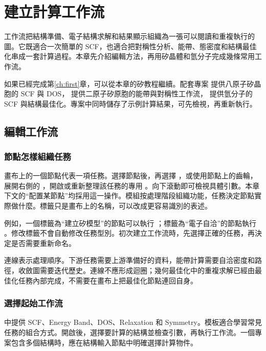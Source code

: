 \chapter{建立計算工作流}\label{ch:workflows}

工作流把結構準備、電子結構求解和結果顯示組織為一張可以閱讀和重複執行的圖。它既適合一次簡單的 SCF，也適合把對稱性分析、能帶、態密度和結構最佳化串成一套計算過程。本章先介紹編輯方法，再用矽晶體和氫分子完成幾條常用工作流。

如果已經完成第\ref{ch:first}章，可以從本章的矽教程繼續。配套專案  提供八原子矽晶胞的 SCF 與 DOS， 提供二原子矽原胞的能帶與對稱性工作流， 提供氫分子的 SCF 與結構最佳化。專案中同時儲存了示例計算結果，可先檢視，再重新執行。

\section{編輯工作流}

\subsection{節點怎樣組織任務}

畫布上的一個節點代表一項任務。選擇節點後，再選擇 ，或使用節點上的齒輪，展開右側的 ，開啟或重新整理該任務的專用 。向下滾動即可檢視具體引數。本章下文的“配置某節點”均採用這一操作。模組按處理階段組織功能，任務決定節點實際做什麼。標籤只是畫布上的名稱，可以改成更容易識別的表述。

例如，一個標籤為“建立矽模型”的節點可以執行 ；標籤為“電子自洽”的節點執行 。修改標籤不會自動修改任務型別。初次建立工作流時，先選擇正確的任務，再決定是否需要重新命名。

連線表示處理順序。下游任務需要上游準備好的資料，能帶計算需要自洽密度和路徑，收斂圖需要迭代歷史。連線不應形成迴圈；幾何最佳化中的重複求解已經由最佳化任務內部完成，不需要在畫布上把最佳化節點連回自身。

\subsection{選擇起始工作流}

 中提供 SCF、Energy Band、DOS、Relaxation 和 Symmetry。模板適合學習常見任務的組合方式。開啟後，選擇要計算的結構並檢查引數，再執行工作流。一個專案包含多個結構時，應在結構輸入節點中明確選擇計算物件。

